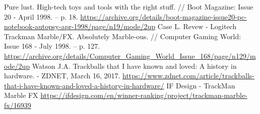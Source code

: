 \documentclass[11pt, a4paper]{article}
\begin{document}
\begin{thebibliography}{9}
 Pure lust. High-tech toys and tools with the right stuff. // Boot Magazine: Issue 20 - April 1998. -- p. 18. \url{https://archive.org/details/boot-magazine-issue20-pc-notebook-autopsy-apr-1998/page/n19/mode/2up}
 Case L. Revew - Logitech Trackman Marble/FX. Absolutely Marble-ous. // Computer Gaming World: Issue 168 - July 1998. -- p. 127.  \url{https://archive.org/details/Computer_Gaming_World_Issue_168/page/n129/mode/2up}
 Watson J.A. Trackballs that I have known and loved: A history in hardware. - ZDNET, March 16, 2017. \url{https://www.zdnet.com/article/trackballs-that-i-have-known-and-loved-a-history-in-hardware/}
 IF Design - TrackMan Marble FX \url{https://ifdesign.com/en/winner-ranking/project/trackman-marble-fx/16939}
\end{thebibliography}
\end{document}
